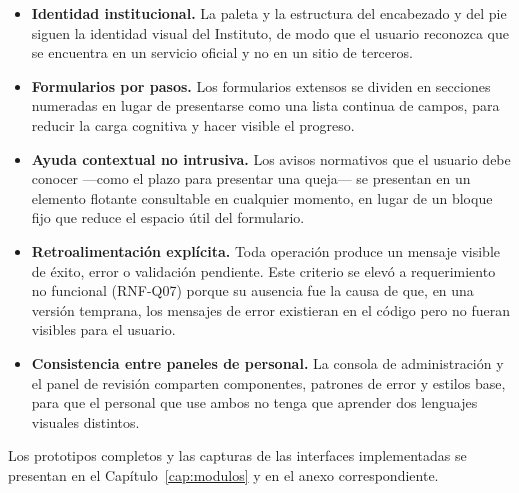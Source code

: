 	\begin{itemize}
		\item \textbf{Identidad institucional.} La paleta y la estructura del encabezado y del pie
		siguen la identidad visual del Instituto, de modo que el usuario reconozca que se encuentra en
		un servicio oficial y no en un sitio de terceros.
	
		\item \textbf{Formularios por pasos.} Los formularios extensos se dividen en secciones
		numeradas en lugar de presentarse como una lista continua de campos, para reducir la carga
		cognitiva y hacer visible el progreso.
	
		\item \textbf{Ayuda contextual no intrusiva.} Los avisos normativos que el usuario debe
		conocer ---como el plazo para presentar una queja--- se presentan en un elemento flotante
		consultable en cualquier momento, en lugar de un bloque fijo que reduce el espacio útil del
		formulario.
	
		\item \textbf{Retroalimentación explícita.} Toda operación produce un mensaje visible de
		éxito, error o validación pendiente. Este criterio se elevó a requerimiento no funcional
		(RNF-Q07) porque su ausencia fue la causa de que, en una versión temprana, los mensajes de
		error existieran en el código pero no fueran visibles para el usuario.
	
		\item \textbf{Consistencia entre paneles de personal.} La consola de administración y el panel
		de revisión comparten componentes, patrones de error y estilos base, para que el personal que
		use ambos no tenga que aprender dos lenguajes visuales distintos.
	\end{itemize}
	
	Los prototipos completos y las capturas de las interfaces implementadas se presentan en el
	Capítulo~\ref{cap:modulos} y en el anexo correspondiente.
